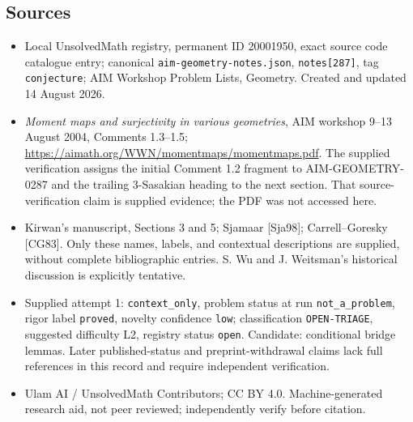 \documentclass[11pt]{article}
\begin{document}
\subsection{Sources}
\begin{itemize}
\item Local UnsolvedMath registry, permanent ID 20001950, exact source code catalogue entry; canonical \texttt{aim-geometry-notes.json}, \texttt{notes[287]}, tag \texttt{conjecture}; AIM Workshop Problem Lists, Geometry. Created and updated 14 August 2026.
\item \emph{Moment maps and surjectivity in various geometries}, AIM workshop 9--13 August 2004, Comments 1.3--1.5; \url{https://aimath.org/WWN/momentmaps/momentmaps.pdf}. The supplied verification assigns the initial Comment 1.2 fragment to AIM-GEOMETRY-0287 and the trailing 3-Sasakian heading to the next section. That source-verification claim is supplied evidence; the PDF was not accessed here.
\item Kirwan's manuscript, Sections 3 and 5; Sjamaar [Sja98]; Carrell--Goresky [CG83]. Only these names, labels, and contextual descriptions are supplied, without complete bibliographic entries. S. Wu and J. Weitsman's historical discussion is explicitly tentative.
\item Supplied attempt 1: \texttt{context\_only}, problem status at run \texttt{not\_a\_problem}, rigor label \texttt{proved}, novelty confidence \texttt{low}; classification \texttt{OPEN-TRIAGE}, suggested difficulty L2, registry status \texttt{open}. Candidate: conditional bridge lemmas. Later published-status and preprint-withdrawal claims lack full references in this record and require independent verification.
\item Ulam AI / UnsolvedMath Contributors; CC BY 4.0. Machine-generated research aid, not peer reviewed; independently verify before citation.
\end{itemize}
\end{document}
